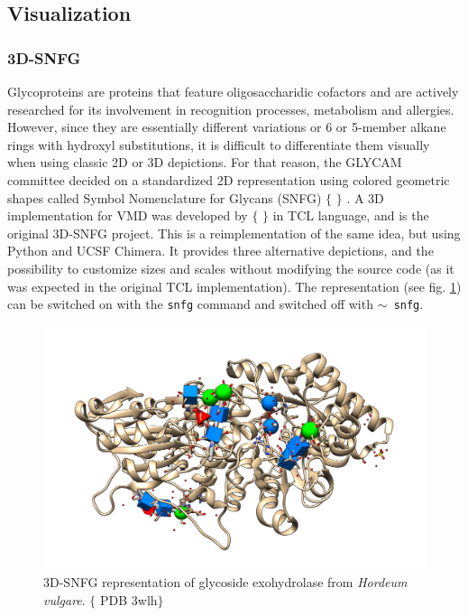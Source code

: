 \subsection{Visualization}
\subsubsection{3D-SNFG}
Glycoproteins are proteins that feature oligosaccharidic cofactors and are actively researched for its involvement in recognition processes, metabolism and allergies. However, since they are essentially different variations or 6 or 5-member alkane rings with hydroxyl  substitutions, it is difficult to differentiate them visually when using classic 2D or 3D depictions. For that reason, the GLYCAM committee decided on a standardized 2D representation using colored geometric shapes called Symbol Nomenclature for Glycans (SNFG) $ \{ $ $ \} $ . A 3D implementation for VMD was developed by $ \{ $ $ \} $  in TCL language, and is the original 3D-SNFG project. This is a reimplementation of the same idea, but using Python and UCSF Chimera. It provides three alternative depictions, and the possibility to customize sizes and scales without modifying the source code (as it was expected in the original TCL implementation). The representation (see fig. \ref{fig:tangram-snfg}) can be switched on with the \texttt{snfg} command and switched off with \texttt{$ \sim $ snfg}.

\begin{figure}[t]
	\begin{Center}
		\includegraphics[width=\textwidth]{./figures/05/tangram_snfg.png}
	\end{Center}
	\cprotect\caption[Tangram 3D-SNFG]{3D-SNFG representation of glycoside exohydrolase from \textit{Hordeum vulgare}. $ \{ $ PDB 3wlh$ \} $}
	\label{fig:tangram-snfg}
\end{figure}


